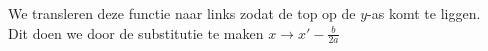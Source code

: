\documentclass[preview]{standalone}
\begin{document}
\begin{center}
We transleren deze functie naar links zodat de top op de $y$-as komt te liggen. \\ Dit doen we door de substitutie te maken $x \rightarrow x' - \frac{b}{2a}$
\end{center}
\end{document}
